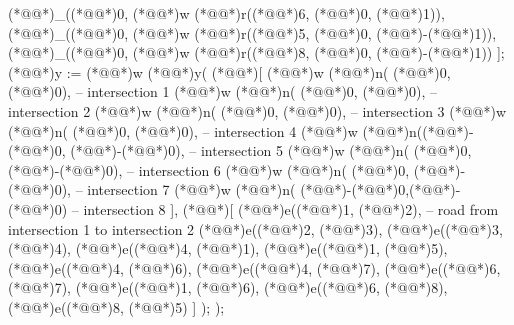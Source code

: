 \documentclass[a4paper]{article}
\begin{document}
\begin{vdm_al}
            (*@@*)_((*@@*)0, (*@@*)w (*@@*)r((*@\vdmnotcovered{}@*)6, (*@@*)0,  (*@\vdmnotcovered{}@*)1)),
            (*@@*)_((*@@*)0, (*@@*)w (*@@*)r((*@\vdmnotcovered{}@*)5, (*@@*)0, (*@\vdmnotcovered{}@*)-(*@\vdmnotcovered{}@*)1)),
            (*@@*)_((*@@*)0, (*@@*)w (*@@*)r((*@\vdmnotcovered{}@*)8, (*@@*)0, (*@\vdmnotcovered{}@*)-(*@\vdmnotcovered{}@*)1))
        ];
        (*@@*)y := (*@@*)w (*@@*)y(
            (*@\vdmnotcovered{}@*)[
                (*@@*)w (*@@*)n(   (*@@*)0,    (*@@*)0), -- intersection 1
                (*@@*)w (*@@*)n(   (*@@*)0,   (*@@*)0), -- intersection 2
                (*@@*)w (*@@*)n( (*@@*)0,   (*@@*)0), -- intersection 3
                (*@@*)w (*@@*)n( (*@@*)0,    (*@@*)0), -- intersection 4
                (*@@*)w (*@@*)n((*@\vdmnotcovered{}@*)-(*@@*)0, (*@\vdmnotcovered{}@*)-(*@@*)0), -- intersection 5
                (*@@*)w (*@@*)n(  (*@@*)0, (*@\vdmnotcovered{}@*)-(*@@*)0), -- intersection 6
                (*@@*)w (*@@*)n( (*@@*)0, (*@\vdmnotcovered{}@*)-(*@@*)0), -- intersection 7
                (*@@*)w (*@@*)n( (*@\vdmnotcovered{}@*)-(*@@*)0,(*@\vdmnotcovered{}@*)-(*@@*)0)  -- intersection 8
            ],
            (*@\vdmnotcovered{}@*)[
                (*@@*)e((*@\vdmnotcovered{}@*)1, (*@\vdmnotcovered{}@*)2), -- road from intersection 1 to intersection 2
                (*@@*)e((*@\vdmnotcovered{}@*)2, (*@\vdmnotcovered{}@*)3),
                (*@@*)e((*@\vdmnotcovered{}@*)3, (*@\vdmnotcovered{}@*)4),
                (*@@*)e((*@\vdmnotcovered{}@*)4, (*@\vdmnotcovered{}@*)1),
                (*@@*)e((*@\vdmnotcovered{}@*)1, (*@\vdmnotcovered{}@*)5),
                (*@@*)e((*@\vdmnotcovered{}@*)4, (*@\vdmnotcovered{}@*)6),
                (*@@*)e((*@\vdmnotcovered{}@*)4, (*@\vdmnotcovered{}@*)7),
                (*@@*)e((*@\vdmnotcovered{}@*)6, (*@\vdmnotcovered{}@*)7),
                (*@@*)e((*@\vdmnotcovered{}@*)1, (*@\vdmnotcovered{}@*)6),
                (*@@*)e((*@\vdmnotcovered{}@*)6, (*@\vdmnotcovered{}@*)8),
                (*@@*)e((*@\vdmnotcovered{}@*)8, (*@\vdmnotcovered{}@*)5)
            ]
        );
    );


\end{vdm_al}
\end{document}
